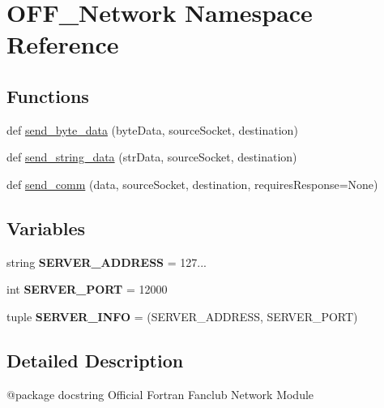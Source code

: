 \hypertarget{namespace_o_f_f___network}{}\section{O\+F\+F\+\_\+\+Network Namespace Reference}
\label{namespace_o_f_f___network}
\subsection*{Functions}
\begin{DoxyCompactItemize}
\item 
def \hyperlink{namespace_o_f_f___network_a0ab8439ad8255392538b5966e5168506}{send\+\_\+byte\+\_\+data} (byte\+Data, source\+Socket, destination)
\item 
def \hyperlink{namespace_o_f_f___network_ad4c88e602c445d2b5a4a32564decf49c}{send\+\_\+string\+\_\+data} (str\+Data, source\+Socket, destination)
\item 
def \hyperlink{namespace_o_f_f___network_a07ee3bf5d20771b38ba37bc09a63988b}{send\+\_\+comm} (data, source\+Socket, destination, requires\+Response=None)
\end{DoxyCompactItemize}
\subsection*{Variables}
\begin{DoxyCompactItemize}
\item 
\mbox{\label{namespace_o_f_f___network_ad232c6acf89aff71164690067844a2d3}} 
string {\bfseries S\+E\+R\+V\+E\+R\+\_\+\+A\+D\+D\+R\+E\+SS} = \textquotesingle{}127...\textquotesingle{}
\item 
\mbox{\label{namespace_o_f_f___network_ad86d6e025f98f77f2513ed47b6a9c9ed}} 
int {\bfseries S\+E\+R\+V\+E\+R\+\_\+\+P\+O\+RT} = 12000
\item 
\mbox{\label{namespace_o_f_f___network_a983ac01abcf0c3b7e474984e7ece31b7}} 
tuple {\bfseries S\+E\+R\+V\+E\+R\+\_\+\+I\+N\+FO} = (S\+E\+R\+V\+E\+R\+\_\+\+A\+D\+D\+R\+E\+SS, S\+E\+R\+V\+E\+R\+\_\+\+P\+O\+RT)
\end{DoxyCompactItemize}


\subsection{Detailed Description}
\begin{DoxyVerb}@package docstring
Official Fortran Fanclub Network Module\end{DoxyVerb}
 

